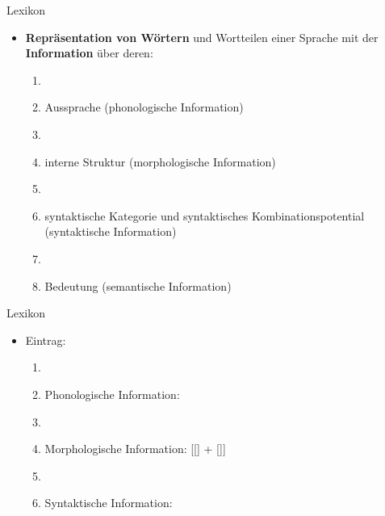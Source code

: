 \begin{frame}{Lexikon}
	
	\begin{itemize}
		\item \textbf{Repräsentation von Wörtern} und Wortteilen einer Sprache mit der \textbf{Information} über deren:

		\begin{enumerate}
			\item[]
			\item Aussprache (phonologische Information)
			\item[]
			\item interne Struktur (morphologische Information)
			\item[]
			\item syntaktische Kategorie und syntaktisches Kombinationspotential (syntaktische Information)
			\item[]
			\item Bedeutung (semantische Information) 
		\end{enumerate}		  
			
	\end{itemize}
		
\end{frame}



\begin{frame}{Lexikon}
			
\begin{itemize}
	\item Eintrag: 

	\begin{enumerate}
		\item[]
		\item Phonologische Information: 
		\item[]
		\item Morphologische Information: [[] + []]
		\item[]
		\item Syntaktische Information: \\
%					
	\end{enumerate}		  

\end{itemize}

\end{frame}



